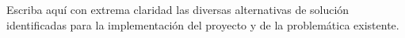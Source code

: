 \justifying

Escriba aquí con extrema claridad las diversas alternativas de solución identificadas para la implementación del proyecto y de la problemática existente.